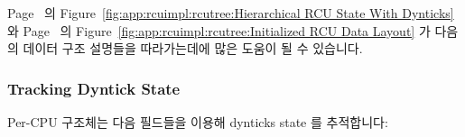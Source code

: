 Page~\pageref{fig:app:rcuimpl:rcutree:Hierarchical RCU State With Dynticks}
의
Figure~\ref{fig:app:rcuimpl:rcutree:Hierarchical RCU State With Dynticks}
와
Page~\pageref{fig:app:rcuimpl:rcutree:Initialized RCU Data Layout}
의
Figure~\ref{fig:app:rcuimpl:rcutree:Initialized RCU Data Layout}
가 다음의 데이터 구조 설명들을 따라가는데에 많은 도움이 될 수 있습니다.
\iffalse

Figure~\ref{fig:app:rcuimpl:rcutree:Hierarchical RCU State With Dynticks}
on
Page~\pageref{fig:app:rcuimpl:rcutree:Hierarchical RCU State With Dynticks}
and
Figure~\ref{fig:app:rcuimpl:rcutree:Initialized RCU Data Layout}
on
Page~\pageref{fig:app:rcuimpl:rcutree:Initialized RCU Data Layout}
can be very helpful in keeping one's place through the following detailed
data-structure descriptions.
\fi

\subsubsection{Tracking Dyntick State}
\label{app:rcuimpl:rcutreewt:Tracking Dyntick State}

Per-CPU  구조체는 다음 필드들을 이용해 dynticks state 를
추적합니다:
\iffalse

The per-CPU \co{rcu_dynticks} structure tracks dynticks state using the
following fields:
\fi

